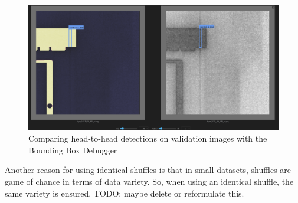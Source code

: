 \begin{figure}
    \centering
    \includegraphics[width=\textwidth]{images/bb_debugger}
    \caption{Comparing head-to-head detections on validation images with the Bounding Box Debugger}
    \label{fig:bb_deb}
\end{figure}

Another reason for using identical shuffles is that in small datasets, shuffles are game of chance in terms of data variety. So, when using an identical shuffle, the same variety is ensured. TODO: maybe delete or reformulate this. \\


